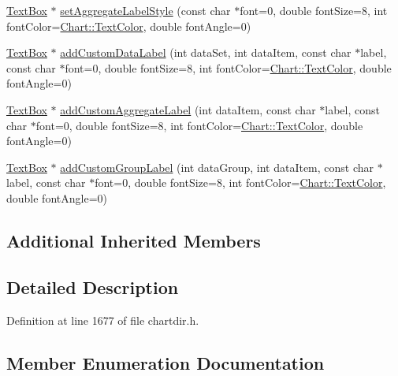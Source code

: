 \begin{DoxyCompactItemize}
\item 
\hyperlink{class_text_box}{Text\+Box} $\ast$ \hyperlink{class_layer_a924df6a49e4fa18109cae3afd16eaf8f}{set\+Aggregate\+Label\+Style} (const char $\ast$font=0, double font\+Size=8, int font\+Color=\hyperlink{namespace_chart_abee0d882fdc9ad0b001245ad9fc64011a879e14f2f5024caccc047374342321ef}{Chart\+::\+Text\+Color}, double font\+Angle=0)
\item 
\hyperlink{class_text_box}{Text\+Box} $\ast$ \hyperlink{class_layer_a8daa0b0f20efaca09d39862f1d2907d3}{add\+Custom\+Data\+Label} (int data\+Set, int data\+Item, const char $\ast$label, const char $\ast$font=0, double font\+Size=8, int font\+Color=\hyperlink{namespace_chart_abee0d882fdc9ad0b001245ad9fc64011a879e14f2f5024caccc047374342321ef}{Chart\+::\+Text\+Color}, double font\+Angle=0)
\item 
\hyperlink{class_text_box}{Text\+Box} $\ast$ \hyperlink{class_layer_a976d43d07961d45ecc945fdcbeba0e66}{add\+Custom\+Aggregate\+Label} (int data\+Item, const char $\ast$label, const char $\ast$font=0, double font\+Size=8, int font\+Color=\hyperlink{namespace_chart_abee0d882fdc9ad0b001245ad9fc64011a879e14f2f5024caccc047374342321ef}{Chart\+::\+Text\+Color}, double font\+Angle=0)
\item 
\hyperlink{class_text_box}{Text\+Box} $\ast$ \hyperlink{class_layer_a1180f9510bf8f0495f9cc02410c31945}{add\+Custom\+Group\+Label} (int data\+Group, int data\+Item, const char $\ast$label, const char $\ast$font=0, double font\+Size=8, int font\+Color=\hyperlink{namespace_chart_abee0d882fdc9ad0b001245ad9fc64011a879e14f2f5024caccc047374342321ef}{Chart\+::\+Text\+Color}, double font\+Angle=0)
\end{DoxyCompactItemize}
\subsection*{Additional Inherited Members}


\subsection{Detailed Description}


Definition at line 1677 of file chartdir.\+h.



\subsection{Member Enumeration Documentation}
\mbox{\label{class_layer_ab29b553b471eb550d5e950aad5100ac4}} 
